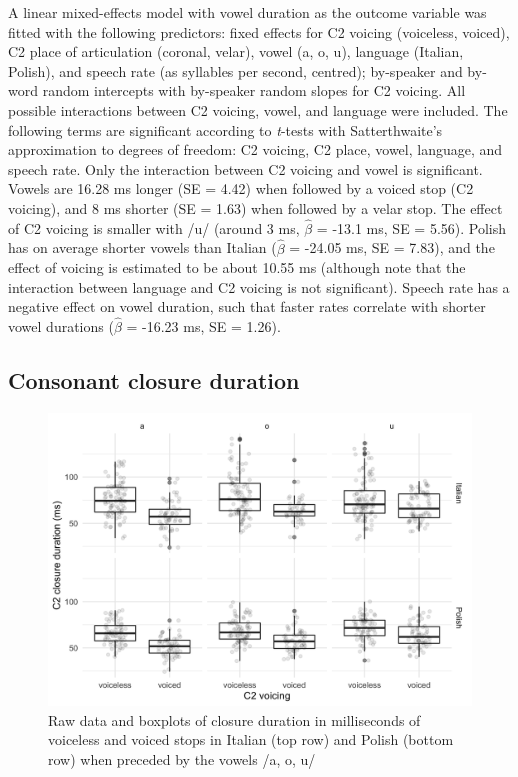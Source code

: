 \documentclass[charis]{glossa}
\begin{document}
A linear mixed-effects model with vowel duration as the outcome variable
was fitted with the following predictors: fixed effects for C2 voicing
(voiceless, voiced), C2 place of articulation (coronal, velar), vowel
(a, o, u), language (Italian, Polish), and speech rate (as syllables per
second, centred); by-speaker and by-word random intercepts with
by-speaker random slopes for C2 voicing. All possible interactions
between C2 voicing, vowel, and language were included. The following
terms are significant according to \emph{t}-tests with Satterthwaite's
approximation to degrees of freedom: C2 voicing, C2 place, vowel,
language, and speech rate. Only the interaction between C2 voicing and
vowel is significant. Vowels are 16.28 ms longer (SE = 4.42) when
followed by a voiced stop (C2 voicing), and 8 ms shorter (SE = 1.63)
when followed by a velar stop. The effect of C2 voicing is smaller with
/u/ (around 3 ms, \(\hat{\beta}\) = -13.1 ms, SE = 5.56). Polish has on
average shorter vowels than Italian (\(\hat{\beta}\) = -24.05 ms, SE =
7.83), and the effect of voicing is estimated to be about 10.55 ms
(although note that the interaction between language and C2 voicing is
not significant). Speech rate has a negative effect on vowel duration,
such that faster rates correlate with shorter vowel durations
(\(\hat{\beta}\) = -16.23 ms, SE = 1.26).

\hypertarget{consonant-closure-duration}{%
\subsection{Consonant closure
duration}\label{consonant-closure-duration}}

\label{s:cduration}

\begin{figure}
\includegraphics[width=\linewidth]{./Figure3} \caption{Raw data and boxplots of closure duration in milliseconds of voiceless and voiced stops in Italian (top row) and Polish (bottom row) when preceded by the vowels /a, o, u/}\label{f:Figure3}
\end{figure}
\end{document}
